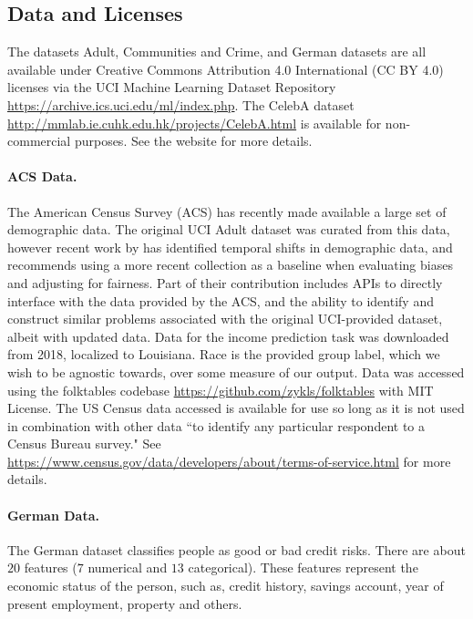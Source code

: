 \subsection{Data and Licenses}

The datasets Adult, Communities and Crime, and German datasets are all available under Creative Commons Attribution 4.0 International (CC BY 4.0) licenses via the UCI Machine Learning Dataset Repository \url{https://archive.ics.uci.edu/ml/index.php}.
The CelebA dataset \url{http://mmlab.ie.cuhk.edu.hk/projects/CelebA.html} is available for non-commercial purposes. See the website for more details.

\paragraph{ACS Data.}
The American Census Survey (ACS) has recently made available a large set of demographic data. The original UCI Adult dataset \cite{uci} was curated from this data, however recent work by \cite{ding2021retiring} has identified temporal shifts in demographic data, and recommends using a more recent collection as a baseline when evaluating biases and adjusting for fairness.
Part of their contribution includes APIs to directly interface with the data provided by the ACS, and the ability to identify and construct similar problems associated with the original UCI-provided dataset, albeit with updated data. Data for the income prediction task was downloaded from 2018, localized to Louisiana. 
Race is the provided group label, which we wish to be agnostic towards, over some measure of our output.
Data was accessed using the folktables codebase \url{https://github.com/zykls/folktables} with MIT License. The US Census data accessed is available for use so long as it is not used in combination with other data ``to identify any particular respondent to a Census Bureau survey." See \url{https://www.census.gov/data/developers/about/terms-of-service.html} for more details.

\paragraph{German Data.}
 The German dataset classifies people as good or bad credit risks. There are about $20$ features ($7$ numerical and $13$ categorical). These features represent the economic status of the person, such as, credit history, savings account, year of present employment, property and others.
 
